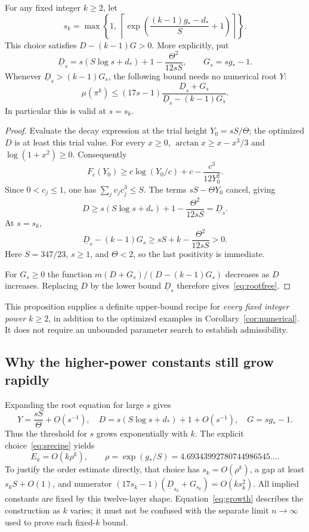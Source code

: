 \begin{proposition}\label{prop:allodd}
For any fixed integer \(k\ge2\), let
\begin{equation}\label{eq:srecipe}
s_k=\max\left\{1,\
\left\lceil\exp\left(
\frac{(k-1)g_*-d_*}{S}+1\right)\right\rceil\right\}.
\end{equation}
This choice satisfies \(D-(k-1)G>0\). More explicitly, put
\[
\underline D_s=s(S\log s+d_*)+1-\frac{\Theta^2}{12sS},
\qquad G_s=sg_*-1.
\]
Whenever \(\underline D_s>(k-1)G_s\), the following bound needs no
numerical root \(Y\):
\begin{equation}\label{eq:rootfree}
\mu(\pi^k)\le
(17s-1)\frac{\underline D_s+G_s}
 {\underline D_s-(k-1)G_s}.
\end{equation}
In particular this is valid at \(s=s_k\).
\end{proposition}
\begin{proof}
Evaluate the decay expression at the trial height \(Y_0=sS/\Theta\);
the optimized \(D\) is at least this trial value.
For every \(x\ge0\),
\(\arctan x\ge x-x^3/3\) and \(\log(1+x^2)\ge0\).
Consequently
\[
F_c(Y_0)\ge c\log(Y_0/c)+c-\frac{c^3}{12Y_0^2}.
\]
Since \(0<c_j\le1\), one has \(\sum_jv_jc_j^3\le S\).
The terms \(sS-\Theta Y_0\) cancel, giving
\[
D\ge s(S\log s+d_*)+1-\frac{\Theta^2}{12sS}
=\underline D_s.
\]
At \(s=s_k\),
\[
\underline D_s-(k-1)G_s
\ge sS+k-\frac{\Theta^2}{12sS}>0.
\]
Here \(S=347/23\), \(s\ge1\), and \(\Theta<2\), so the last
positivity is immediate.

For \(G_s\ge0\) the function
\(m(D+G_s)/(D-(k-1)G_s)\) decreases as \(D\) increases.
Replacing \(D\) by the lower bound \(\underline D_s\) therefore
gives~\eqref{eq:rootfree}.
\end{proof}

This proposition supplies a definite upper-bound recipe for
\emph{every fixed integer power \(k\ge2\)}, in addition to the optimized examples
in Corollary~\ref{cor:numerical}. It does not require an unbounded
parameter search to establish admissibility.

\subsection{Why the higher-power constants still grow rapidly}

Expanding the root equation for large \(s\) gives
\[
Y=\frac{sS}{\Theta}+O(s^{-1}),\quad
D=s(S\log s+d_*)+1+O(s^{-1}),\quad
G=sg_*-1.
\]
Thus the threshold for \(s\) grows exponentially with \(k\).
The explicit choice~\eqref{eq:srecipe} yields
\begin{equation}\label{eq:growth}
E_k=O(k\rho^k),\qquad
\rho=\exp(g_*/S)=4.69343992780744986545\ldots.
\end{equation}
To justify the order estimate directly, that choice has
\(s_k=O(\rho^k)\), a gap at least \(s_kS+O(1)\), and numerator
\((17s_k-1)(\underline D_{s_k}+G_{s_k})=O(ks_k^2)\).
All implied constants are fixed by this twelve-layer shape.
Equation~\eqref{eq:growth} describes the construction as \(k\)
varies; it must not be confused with the separate limit
\(n\to\infty\) used to prove each fixed-\(k\) bound.

